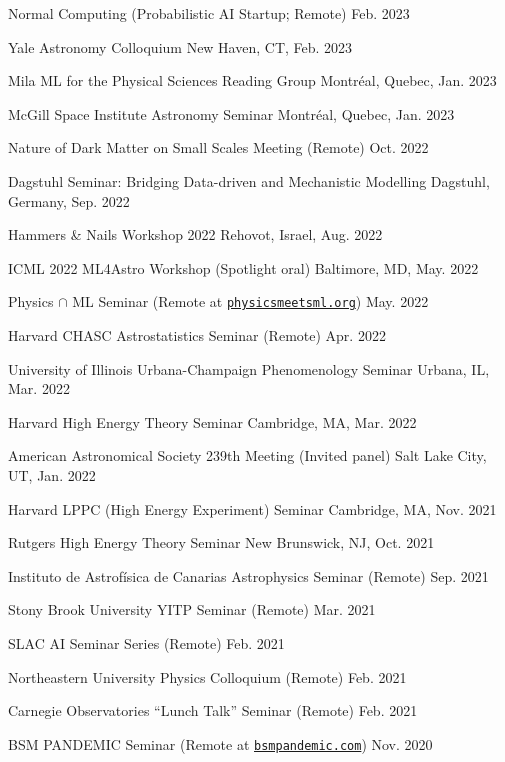\documentclass[letterpaper,11pt]{article}
\newenvironment{packed_itemize}{
\begin{itemize}[label=\raisebox{0.25ex}{\tiny$\bullet$}]
  \setlength{\itemsep}{4.2pt}
  \setlength{\parskip}{0pt}
  \setlength{\parsep}{0pt}}{\end{itemize}
}
\begin{document}
\begin{packed_itemize}
  \item Normal Computing (Probabilistic AI Startup; Remote) \hfill Feb. 2023
  \item Yale Astronomy Colloquium \hfill New Haven, CT, Feb. 2023
  \item Mila ML for the Physical Sciences Reading Group \hfill Montr\'eal, Quebec, Jan. 2023
  \item McGill Space Institute Astronomy Seminar \hfill Montr\'eal, Quebec, Jan. 2023
  \item Nature of Dark Matter on Small Scales Meeting (Remote) \hfill  Oct. 2022
  \item Dagstuhl Seminar: Bridging Data-driven and Mechanistic Modelling \hfill Dagstuhl, Germany, Sep. 2022
  \item Hammers \& Nails Workshop 2022 \hfill Rehovot, Israel, Aug. 2022
  \item ICML 2022 ML4Astro Workshop (Spotlight oral) \hfill Baltimore, MD, May. 2022
  \item Physics $\cap$ ML Seminar (Remote at \href{http://www.physicsmeetsml.org//}{\texttt{physicsmeetsml.org}}) \hfill May. 2022
  \item Harvard CHASC Astrostatistics Seminar (Remote)  \hfill Apr. 2022
  \item University of Illinois Urbana-Champaign Phenomenology Seminar  \hfill Urbana, IL, Mar. 2022
  \item Harvard High Energy Theory Seminar \hfill Cambridge, MA, Mar. 2022
  \item American Astronomical Society 239th Meeting (Invited panel)  \hfill Salt Lake City, UT, Jan. 2022
  \item Harvard LPPC (High Energy Experiment) Seminar \hfill Cambridge, MA, Nov. 2021
  \item Rutgers High Energy Theory Seminar \hfill New Brunswick, NJ, Oct. 2021
  \item Instituto de Astrof\'{i}sica de Canarias Astrophysics Seminar (Remote) \hfill Sep. 2021
  \item Stony Brook University YITP Seminar (Remote) \hfill Mar. 2021
  \item SLAC AI Seminar Series (Remote) \hfill Feb. 2021
  \item Northeastern University Physics Colloquium (Remote) \hfill Feb. 2021
  \item Carnegie Observatories ``Lunch Talk'' Seminar (Remote) \hfill Feb. 2021
  \item BSM PANDEMIC Seminar  (Remote at \href{https://www.bsmpandemic.com/}{\texttt{bsmpandemic.com}}) \hfill Nov. 2020

\end{packed_itemize}
\end{document}

